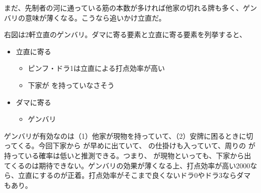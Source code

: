 \documentclass[../nankiru_main.tex]{subfiles}
\begin{document}
まだ、先制者の河に通っている筋の本数が多ければ他家の切れる牌も多く、ゲンバリの意味が薄くなる。こうなら追いかけ立直だ\citep[][p.~81]{doi}。

\begin{minipage}[t][6.5cm]{\textwidth}
  \begin{figure}\vspace{-1.5\topskip}
  \end{figure}
  
  右図は2軒立直のゲンバリ。ダマに寄る要素と立直に寄る要素を列挙すると、
  
  \begin{itemize}
    \item 立直に寄る
    \begin{itemize}
      \item ピンフ・ドラ1は立直による打点効率が高い
      \item 下家が  を持っていなさそう
    \end{itemize}
    \item ダマに寄る
    \begin{itemize}
      \item ゲンバリ
    \end{itemize}
  \end{itemize}
  
  ゲンバリが有効なのは（1）他家が現物を持っていて、（2）安牌に困るときに切ってくる。今回下家から  が早めに出ていて、 の仕掛けも入っていて、周りの  が持っている確率は低いと推測できる。つまり、 が現物といっても、下家から出てくるのは期待できない。ゲンバリの効果が薄くなる上、打点効率が高い2000なら、立直にするのが正着。打点効率がそこまで良くないドラ0やドラ3ならダマもあり\citep[][pp.~146--149]{doi}。
\end{minipage}
\end{document}

